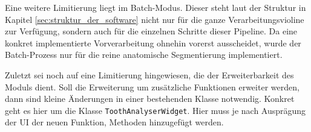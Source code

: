 Eine weitere Limitierung liegt im Batch-Modus. Dieser steht laut der Struktur in
Kapitel \ref{sec:struktur_der_software} nicht nur für die ganze
Verarbeitungsvioline zur Verfügung, sondern auch für die einzelnen Schritte dieser
Pipeline. Da eine konkret implementierte Vorverarbeitung ohnehin vorerst
ausscheidet, wurde der Batch-Prozess nur für die reine anatomische Segmentierung
implementiert.

Zuletzt sei noch auf eine Limitierung hingewiesen, die der Erweiterbarkeit des
Moduls dient. Soll die Erweiterung um zusätzliche Funktionen erweiter werden,
dann sind kleine Änderungen in einer bestehenden Klasse notwendig. Konkret geht es
hier um die Klasse \texttt{ToothAnalyserWidget}. Hier muss je nach Ausprägung der
\ac{UI} der neuen Funktion, Methoden hinzugefügt werden.
